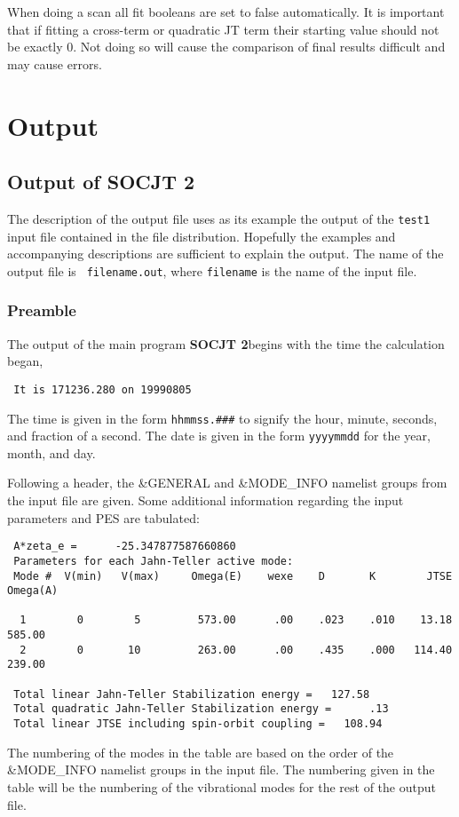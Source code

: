 \documentclass{article}
\newcommand{\socjttwo}{{\bf SOCJT 2}}
\begin{document}
When doing a scan all fit booleans are set to false automatically. It is important
that if fitting a cross-term or quadratic JT term their starting value should not
be exactly 0. Not doing so will cause the comparison of final results difficult and may
cause errors.

\section{Output} \label{section:output}

\subsection{Output of \socjttwo }

The description of the output file uses as its example the output of
the {\tt test1} input file contained in the file
distribution. Hopefully the examples and accompanying descriptions are
sufficient to explain the output. The name of the output file is {\tt
  filename.out}, where {\tt filename} is the name of the input file.

\subsubsection{Preamble}

The output of the main program \socjttwo begins with the time the
calculation began,
\begin{verbatim}
 It is 171236.280 on 19990805
\end{verbatim}
The time is given in the form {\tt hhmmss.\#\#\#} to signify the
hour, minute, seconds, and fraction of a second. The date is given in
the form {\tt yyyymmdd} for the year, month, and day.

Following a header, the \&GENERAL and \&MODE\_INFO namelist groups
from the input file are given. Some additional information regarding
the input parameters and PES are tabulated:
\begin{verbatim}
 A*zeta_e =      -25.347877587660860
 Parameters for each Jahn-Teller active mode:
 Mode #  V(min)   V(max)     Omega(E)    wexe    D       K        JTSE  Omega(A)
 
  1        0        5         573.00      .00    .023    .010    13.18    585.00
  2        0       10         263.00      .00    .435    .000   114.40    239.00
 
 Total linear Jahn-Teller Stabilization energy =   127.58
 Total quadratic Jahn-Teller Stabilization energy =      .13
 Total linear JTSE including spin-orbit coupling =   108.94
\end{verbatim}
The numbering of the modes in the table are based on the order of the
\&MODE\_INFO namelist groups in the input file. The numbering given in
the table will be the numbering of the vibrational modes for the rest
of the output file.
\end{document}
